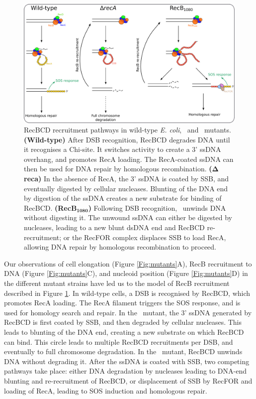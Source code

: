 \begin{figure}[htbp]
    \centering
    \includegraphics[width=\textwidth]{Figures/Fig_mutants_pathways.pdf}
    \caption{RecBCD recruitment pathways in wild-type \emph{E. coli}, \dreca\ and \teneighty\ mutants. \textbf{(Wild-type)} After DSB recognition, RecBCD degrades DNA until it recognises a Chi-site. It switches activity to create a 3' ssDNA overhang, and promotes RecA loading. The RecA-coated ssDNA can then be used for DNA repair by homologous recombination. \textbf{($\mathbf{\Delta}$reca)} In the absence of RecA, the 3' ssDNA is coated by SSB, and eventually digested by cellular nucleases. Blunting of the DNA end by digestion of the ssDNA creates a new substrate for binding of RecBCD. \textbf{(RecB$\mathbf{_{1080}}$)} Following DSB recognition, \teneighty\ unwinds DNA without digesting it. The unwound ssDNA can either be digested by nucleases, leading to a new blunt dsDNA end and RecBCD re-recruitment; or the RecFOR complex displaces SSB to load RecA, allowing DNA repair by homologous recombination to proceed.}
    \label{Fig:pathways}
\end{figure}

Our observations of cell elongation (Figure \ref{Fig:mutants}A), RecB recruitment to DNA (Figure \ref{Fig:mutants}C), and nucleoid position (Figure \ref{Fig:mutants}D) in the different mutant strains have led us to the model of RecB recruitment described in Figure \ref{Fig:pathways}. In wild-type cells, a DSB is recognised by RecBCD, which promotes RecA loading. The RecA filament triggers the SOS response, and is used for homology search and repair. In the \dreca\ mutant, the 3' ssDNA generated by RecBCD is first coated by SSB, and then degraded by cellular nucleases. This leads to blunting of the DNA end, creating a new substrate on which RecBCD can bind. This circle leads to multiple RecBCD recruitments per DSB, and eventually to full chromosome degradation. In the \teneighty\ mutant, RecBCD unwinds DNA without degrading it. After the ssDNA is coated with SSB, two competing pathways take place: either DNA degradation by nucleases leading to DNA-end blunting and re-recruitment of RecBCD, or displacement of SSB by RecFOR and loading of RecA, leading to SOS induction and homologous repair.

